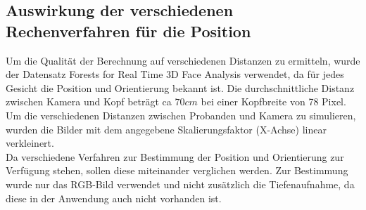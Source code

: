 \subsection{Auswirkung der verschiedenen Rechenverfahren für die Position}
Um die Qualität der Berechnung auf verschiedenen Distanzen zu ermitteln, wurde der Datensatz Forests for Real Time 3D Face Analysis \cite{database_Face_Ori} verwendet, da für jedes Gesicht die Position und Orientierung bekannt ist.
Die durchschnittliche Distanz zwischen Kamera und Kopf beträgt ca $70cm$ bei einer Kopfbreite von 78 Pixel. Um die verschiedenen Distanzen zwischen Probanden und Kamera zu simulieren, wurden die Bilder mit dem angegebene Skalierungsfaktor (X-Achse) linear verkleinert.\\
Da verschiedene Verfahren zur Bestimmung der Position und Orientierung zur Verfügung stehen, sollen diese miteinander verglichen werden. Zur Bestimmung wurde nur das RGB-Bild verwendet und nicht zusätzlich die Tiefenaufnahme, da diese in der Anwendung auch nicht vorhanden ist.
